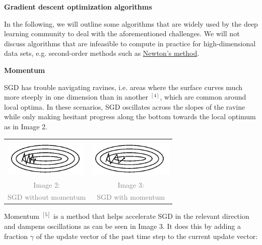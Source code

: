 \documentclass[4pt,journal,compsoc]{IEEEtran}
\begin{document}
\begin{flushleft}
    \textbf{\Large Gradient descent optimization algorithms} \newline
    
    In the following, we will outline some algorithms that are widely used by the deep learning community to deal with the aforementioned challenges. We will not discuss algorithms that are infeasible to compute in practice for high-dimensional data sets, e.g. second-order methods such as \underline{Newton's method}. \newline \newline
    
    \textbf{\Large Momentum} \newline
    
    SGD has trouble navigating ravines, i.e. areas where the surface curves much more steeply in one dimension than in another $ ^ {[4]}$, which are common around local optima. In these scenarios, SGD oscillates across the slopes of the ravine while only making hesitant progress along the bottom towards the local optimum as in Image 2. \newline
    

    \begin{tabular}{|c|c|} 
        \hline \\
        \includegraphics[width = 4cm]{P004.PNG} & \includegraphics[width = 4cm]{P003.PNG}\\ 
        
        \textcolor{gray}{Image 2:} &
        \textcolor{gray}{Image 3:} \\
        
        \textcolor{gray}{SGD without momentum} &
        \textcolor{gray}{SGD with momentum} \\
        \hline
    \end{tabular} \newline \newline
    
    Momentum $^ {[5]}$ is a method that helps accelerate SGD in the relevant direction and dampens oscillations as can be seen in Image 3. It does this by adding a fraction $\gamma$ of the update vector of the past time step to the current update vector: \newline
    

\end{flushleft}
\end{document}
